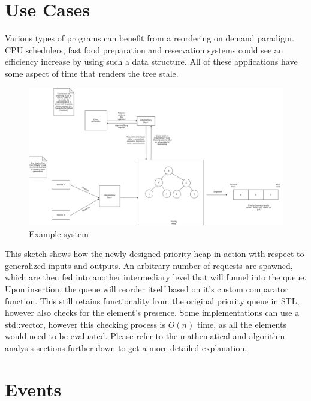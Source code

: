 \documentclass{article}
\begin{document}
\newpage

\section{Use Cases}

\begin{flushleft}

Various types of programs can benefit from a reordering on demand paradigm.
CPU schedulers, fast food preparation and reservation systems could see an efficiency increase by using such a data structure.
All of these applications have some aspect of time that renders the tree stale.

\begin{figure}[!h]
\centering
\includegraphics[width=15cm]{UseCaseSketch}
\caption{Example system}
\end{figure}

This sketch shows how the newly designed priority heap in action with respect to generalized inputs and outputs.
An arbitrary number of requests are spawned, which are then fed into another intermediary level that will funnel into the queue.
Upon insertion, the queue will reorder itself based on it's custom comparator function.
This still retains functionality from the original priority queue in STL, however also checks for the element's presence.
Some implementations can use a std::vector, however this checking process is $O(n)$ time, as all the elements would need to be evaluated.
Please refer to the mathematical and algorithm analysis sections further down to get a more detailed explanation.

\end{flushleft}

\section{Events}
\end{document}
